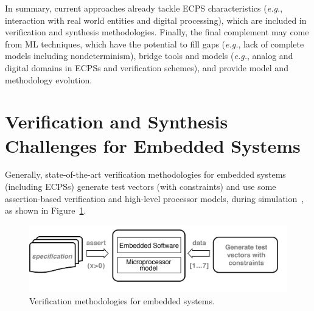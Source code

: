 \documentclass[format=acmsmall, review=false, screen=true]{acmart}
\begin{document}
In summary, current approaches already tackle ECPS characteristics ({\it e.g.}, interaction with real world entities and digital processing), which are included in verification and synthesis methodologies. Finally, the final complement may come from ML techniques, which have the potential to fill gaps ({\it e.g.}, lack of complete models including nondeterminism), bridge tools and models ({\it e.g.}, analog and digital domains in ECPSs and verification schemes), and provide model and methodology evolution.  


\section{Verification and Synthesis \\ Challenges for Embedded Systems}
\label{Verification-Challenges} 

Generally, state-of-the-art verification methodologies for embedded systems (including ECPSs) generate test vectors (with constraints) and use some assertion-based verification and high-level processor models, during simulation~\cite{Behrend15,Lettnin09}, as shown in Figure~\ref{verification-methodologies}. 
%
\begin{figure}[h]
	\centering
	\includegraphics[scale=0.5]{figure4.jpg}
	\caption{Verification methodologies for embedded systems.}
	\label{verification-methodologies}
\end{figure}
\end{document}
